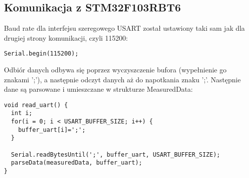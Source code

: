 \documentclass[a4paper,12pt,twoside,openany]{report}
\begin{document}
\subsection{Komunikacja z STM32F103RBT6}

Baud rate dla interfejsu szeregowego USART został ustawiony taki sam jak dla drugiej strony komunikacji, czyli 115200:
\begin{lstlisting}[style=customcpp]
Serial.begin(115200);  
\end{lstlisting}
Odbiór danych odbywa się poprzez wyczyszczenie bufora (wypełnienie go znakami ';'), a następnie odczyt danych aż do napotkania znaku ';'. Następnie dane są parsowane i umieszczane w strukturze MeasuredData:
\begin{lstlisting}[style=customcpp]
void read_uart() {  
  int i;
  for(i = 0; i < USART_BUFFER_SIZE; i++) {
    buffer_uart[i]=';';
  }
    
  Serial.readBytesUntil(';', buffer_uart, USART_BUFFER_SIZE);
  parseData(measuredData, buffer_uart);
}
\end{lstlisting}
\end{document}
